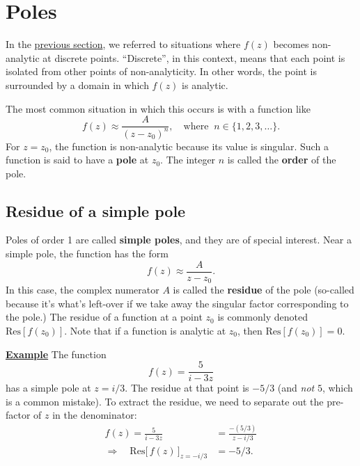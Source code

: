 \documentclass[10pt,a4paper]{article}
\begin{document}
\section{Poles}\label{poles}

In the \hyperref[consequences-of-cauchys-integral-theorem]{previous
  section}, we referred to situations where $f(z)$ becomes
non-analytic at discrete points. ``Discrete'', in this context, means
that each point is isolated from other points of non-analyticity.  In
other words, the point is surrounded by a domain in which $f(z)$ is
analytic.

The most common situation in which this occurs is with a function like
\begin{equation}
  f(z) \approx \frac{A}{(z-z_0)^n}, \quad \mathrm{where}\;\;
  n\in\{1,2,3,\dots\}.
\end{equation}
For $z = z_0$, the function is non-analytic because its value is
singular. Such a function is said to have a \textbf{pole} at $z_0$.
The integer $n$ is called the \textbf{order} of the pole.

\subsection{Residue of a simple pole}
\label{residue-of-a-simple-pole}

Poles of order 1 are called \textbf{simple poles}, and they are of
special interest. Near a simple pole, the function has the form
\begin{equation}
  f(z) \approx \frac{A}{z-z_0}.
\end{equation}
In this case, the complex numerator $A$ is called the \textbf{residue}
of the pole (so-called because it's what's left-over if we take away
the singular factor corresponding to the pole.) The residue of a
function at a point $z_0$ is commonly denoted
$\mathrm{Res}[f(z_0)]$. Note that if a function is analytic at $z_0$,
then $\mathrm{Res}[f(z_0)] = 0$.

\begin{framed}
\noindent
\underline{\textbf{Example}}
\vskip 0.02in \noindent
The function 
\begin{equation}
  f(z) = \frac{5}{i-3z}
\end{equation}
has a simple pole at $z = i/3$.  The residue at that point is $-5/3$
(and \emph{not} $5$, which is a common mistake). To extract the
residue, we need to separate out the pre-factor of $z$ in the
denominator:
\begin{align}
  f(z) = \frac{5}{i-3z} &= \frac{-(5/3)}{z - i/3} \\
  \Rightarrow\quad \mathrm{Res}\big[\,f(z)\,\big]_{z = -i/3} &= - 5/3.
\end{align}
\end{framed}
\end{document}
